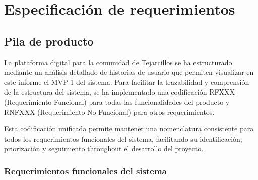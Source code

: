 \chapter{Especificación de requerimientos}
\section{Pila de producto}
La plataforma digital para la comunidad de Tejarcillos se ha estructurado mediante un análisis detallado de historias de usuario que permiten visualizar en este informe el MVP 1 del sistema. Para facilitar la trazabilidad y comprensión de la estructura del sistema, se ha implementado una codificación RFXXX (Requerimiento Funcional) para todas las funcionalidades del producto y RNFXXX (Requerimiento No Funcional) para otros requerimientos.

Esta codificación unificada permite mantener una nomenclatura consistente para todos los requerimientos funcionales del sistema, facilitando su identificación, priorización y seguimiento throughout el desarrollo del proyecto.
\subsection{Requerimientos funcionales del sistema}

